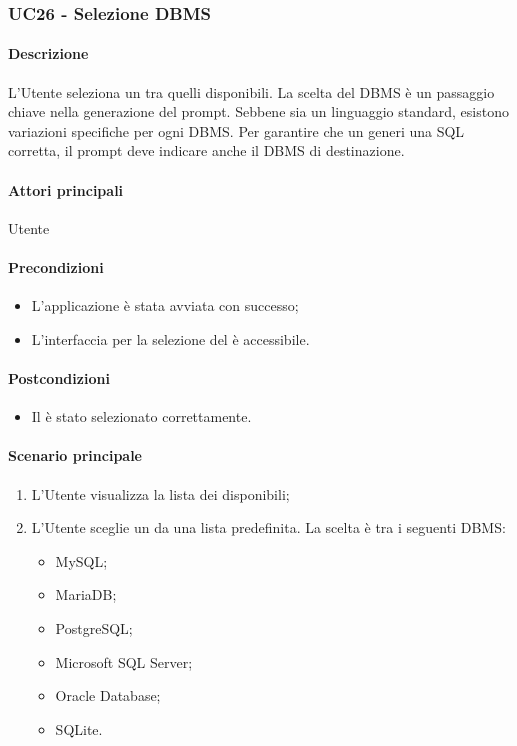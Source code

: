 \subsubsection{UC26 - Selezione DBMS}\label{UC26}

\paragraph*{Descrizione}
L'Utente seleziona un  tra quelli disponibili. La scelta del DBMS è un passaggio chiave nella generazione del prompt. Sebbene  sia un linguaggio standard, esistono variazioni specifiche per ogni DBMS. Per garantire che un  generi una  SQL corretta, il prompt deve indicare anche il DBMS di destinazione.

\paragraph*{Attori principali}
Utente

\paragraph*{Precondizioni}
\begin{itemize}
  \item L'applicazione è stata avviata con successo;
  \item L'interfaccia per la selezione del  è accessibile.
\end{itemize}

\paragraph*{Postcondizioni}
\begin{itemize}
  \item Il  è stato selezionato correttamente.
\end{itemize}

\paragraph*{Scenario principale}
\begin{enumerate}
  \item L'Utente visualizza la lista dei  disponibili;
  \item L'Utente sceglie un  da una lista predefinita. La scelta è tra i seguenti DBMS:
    \begin{itemize}
      \item MySQL;
      \item MariaDB;
      \item PostgreSQL;
      \item Microsoft SQL Server;
      \item Oracle Database;
      \item SQLite.
    \end{itemize} 
\end{enumerate}
